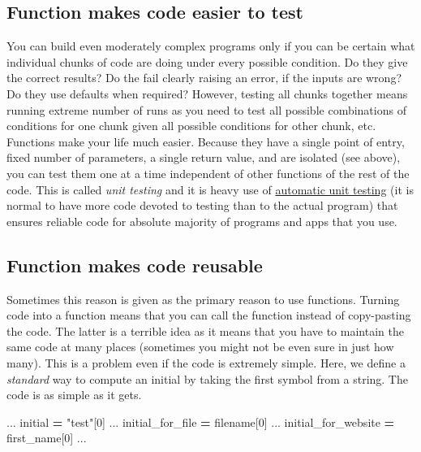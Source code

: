 \documentclass[
]{book}
\newenvironment{Shaded}{\begin{snugshade}}{\end{snugshade}}
\newcommand{\DecValTok}[1]{\textcolor[rgb]{0.00,0.00,0.81}{#1}}
\newcommand{\NormalTok}[1]{#1}
\newcommand{\OperatorTok}[1]{\textcolor[rgb]{0.81,0.36,0.00}{\textbf{#1}}}
\newcommand{\StringTok}[1]{\textcolor[rgb]{0.31,0.60,0.02}{#1}}
\begin{document}
\hypertarget{function-makes-code-easier-to-test}{%
\subsection*{Function makes code easier to test}\label{function-makes-code-easier-to-test}}

You can build even moderately complex programs only if you can be certain what individual chunks of code are doing under every possible condition. Do they give the correct results? Do the fail clearly raising an error, if the inputs are wrong? Do they use defaults when required? However, testing all chunks together means running extreme number of runs as you need to test all possible combinations of conditions for one chunk given all possible conditions for other chunk, etc. Functions make your life much easier. Because they have a single point of entry, fixed number of parameters, a single return value, and are isolated (see above), you can test them one at a time independent of other functions of the rest of the code. This is called \emph{unit testing} and it is heavy use of \href{https://docs.python.org/3/library/unittest.html}{automatic unit testing} (it is normal to have more code devoted to testing than to the actual program) that ensures reliable code for absolute majority of programs and apps that you use.

\hypertarget{function-makes-code-reusable}{%
\subsection*{Function makes code reusable}\label{function-makes-code-reusable}}

Sometimes this reason is given as the primary reason to use functions. Turning code into a function means that you can call the function instead of copy-pasting the code. The latter is a terrible idea as it means that you have to maintain the same code at many places (sometimes you might not be even sure in just how many). This is a problem even if the code is extremely simple. Here, we define a \emph{standard} way to compute an initial by taking the first symbol from a string. The code is as simple as it gets.

\begin{Shaded}
\begin{Highlighting}[]
\NormalTok{...}
\NormalTok{initial }\OperatorTok{=} \StringTok{"test"}\NormalTok{[}\DecValTok{0}\NormalTok{]}
\NormalTok{...}
\NormalTok{initial\_for\_file }\OperatorTok{=}\NormalTok{ filename[}\DecValTok{0}\NormalTok{]}
\NormalTok{...}
\NormalTok{initial\_for\_website }\OperatorTok{=}\NormalTok{ first\_name[}\DecValTok{0}\NormalTok{]}
\NormalTok{...}
\end{Highlighting}
\end{Shaded}
\end{document}
